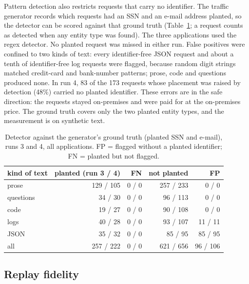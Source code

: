 \documentclass[11pt]{article}
\begin{document}
Pattern detection also restricts requests that carry no identifier. The traffic generator
records which requests had an SSN and an e-mail address planted, so the detector can be scored
against that ground truth (Table~\ref{tab:detector}; a request counts as detected when any entity
type was found). The three applications used the regex detector. No planted request was missed in either run. False positives were confined to
two kinds of text: every identifier-free JSON request and about a tenth of identifier-free log
requests were flagged, because random digit strings matched credit-card and bank-number
patterns; prose, code and questions produced none. In run 4, 83 of the 173 requests whose
placement was raised by detection (48\%) carried no planted identifier. These errors are in the
safe direction: the requests stayed on-premises and were paid for at the on-premises price. The
ground truth covers only the two planted entity types, and the measurement is on synthetic text.

\begin{table}[t]
\centering
\small
\caption{Detector against the generator's ground truth (planted SSN and e-mail), runs 3 and 4,
all applications. FP = flagged without a planted identifier; FN = planted but not flagged.}
\label{tab:detector}
\begin{tabular}{@{}lrrrr@{}}
\toprule
kind of text & planted (run 3 / 4) & FN & not planted & FP \\
\midrule
prose & 129 / 105 & 0 / 0 & 257 / 233 & 0 / 0 \\
questions & 34 / 30 & 0 / 0 & 96 / 113 & 0 / 0 \\
code & 19 / 27 & 0 / 0 & 90 / 108 & 0 / 0 \\
logs & 40 / 28 & 0 / 0 & 93 / 107 & 11 / 11 \\
JSON & 35 / 32 & 0 / 0 & 85 / 95 & 85 / 95 \\
\midrule
all & 257 / 222 & 0 / 0 & 621 / 656 & 96 / 106 \\
\bottomrule
\end{tabular}
\end{table}

\subsection{Replay fidelity}
\end{document}
